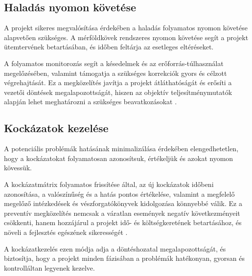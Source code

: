 \subsection{Haladás nyomon követése}

A projekt sikeres megvalósítása érdekében a haladás folyamatos nyomon követése alapvetően szükséges.  
A mérföldkövek rendszeres nyomon követése segít a projekt ütemtervének betartásában, és időben feltárja az esetleges eltéréseket.

A folyamatos monitorozás segít a késedelmek és az erőforrás-túlhasználat megelőzésében,  
valamint támogatja a szükséges korrekciók gyors és célzott végrehajtását.  
Ez a megközelítés javítja a projekt átláthatóságát és erősíti a vezetői döntések megalapozottságát,  
hiszen az objektív teljesítménymutatók alapján lehet meghatározni a szükséges beavatkozásokat \cite{Kovacs2016,Kaposi2019}.  

\subsection{Kockázatok kezelése}

A potenciális problémák hatásának minimalizálása érdekében elengedhetetlen, hogy a kockázatokat folyamatosan azonosítsuk, értékeljük és azokat nyomon kövessük.  

A kockázatmátrix folyamatos frissítése által, az új kockázatok időbeni azonosítása, 
a valószínűség és a hatás pontos értékelése, valamint a megfelelő megelőző intézkedések és vészforgatókönyvek kidolgozása könnyebbé válik.
Ez a preventív megközelítés nemcsak a váratlan események negatív következményeit csökkenti,  
hanem hozzájárul a projekt idő- és költségkeretének betartásához, és növeli a fejlesztés egészének sikerességét \cite{Hajdu2014,Szalay2018}.  

A kockázatkezelés ezen módja adja a döntéshozatal megalapozottságát,  
és biztosítja, hogy a projekt minden fázisában a problémák hatékonyan, gyorsan és kontrolláltan legyenek kezelve.

